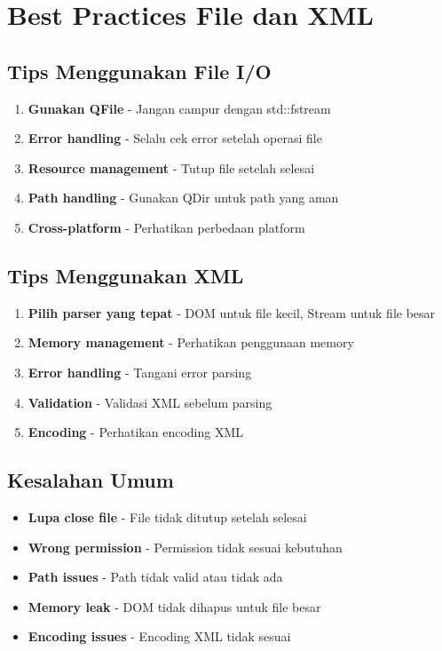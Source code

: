\section{Best Practices File dan XML}

\subsection{Tips Menggunakan File I/O}

\begin{enumerate}
\item \textbf{Gunakan QFile} - Jangan campur dengan std::fstream
\item \textbf{Error handling} - Selalu cek error setelah operasi file
\item \textbf{Resource management} - Tutup file setelah selesai
\item \textbf{Path handling} - Gunakan QDir untuk path yang aman
\item \textbf{Cross-platform} - Perhatikan perbedaan platform
\end{enumerate}

\subsection{Tips Menggunakan XML}

\begin{enumerate}
\item \textbf{Pilih parser yang tepat} - DOM untuk file kecil, Stream untuk file besar
\item \textbf{Memory management} - Perhatikan penggunaan memory
\item \textbf{Error handling} - Tangani error parsing
\item \textbf{Validation} - Validasi XML sebelum parsing
\item \textbf{Encoding} - Perhatikan encoding XML
\end{enumerate}

\subsection{Kesalahan Umum}

\begin{itemize}
\item \textbf{Lupa close file} - File tidak ditutup setelah selesai
\item \textbf{Wrong permission} - Permission tidak sesuai kebutuhan
\item \textbf{Path issues} - Path tidak valid atau tidak ada
\item \textbf{Memory leak} - DOM tidak dihapus untuk file besar
\item \textbf{Encoding issues} - Encoding XML tidak sesuai
\end{itemize}

